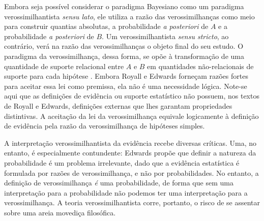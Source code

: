 Embora seja possível considerar o paradigma Bayesiano como um paradigma verossimilhantista {\em sensu lato}, 
ele utiliza a razão das verossimilhanças como meio para construir quantias absolutas, a probabilidade 
{\em a posteriori} de $A$ e a probabilidade {\em a posteriori} de $B$. Um verossimilhantista {\em sensu stricto}, ao contrário,
verá na razão das verossimilhanças
o objeto final do seu estudo. O paradigma da verossimilhança, dessa forma, se opõe à transformação de uma quantidade de 
suporte relacional entre $A$ e $B$ em quantidades não-relacionais de
suporte para cada hipótese \citep{Fitelson07}. %
Embora Royall e Edwards forneçam razões fortes para aceitar essa lei como premissa, ela não é uma necessidade lógica.
Note-se aqui que as definições de evidência ou suporte estatístico não possuem, nos textos de Royall e Edwards,
definições externas que lhes garantam
propriedades distintivas. %
A aceitação da lei da verossimilhança equivale logicamente à definição de evidência pela razão
da verossimilhança de hipóteses simples. %

A interpretação verossimilhantista da evidência recebe diversas críticas. Uma, no entanto, é especialmente contundente:
Edwards propõe que definir a natureza da probabilidade é um problema irrelevante, dado que a evidência estatística é
formulada por razões de verossimilhança, e não por probabilidades. No entanto, a definição de verossimilhança {\em é} uma
probabilidade, de forma que sem uma interpretação para a probabilidade não podemos ter uma interpretação para a verossimilhança.
A teoria verossimilhantista corre, portanto, o risco de se assentar
sobre uma areia movediça filosófica.

